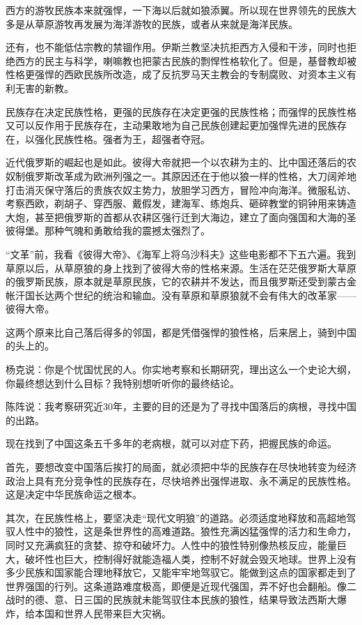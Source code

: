 \par 西方的游牧民族本来就强悍，一下海以后就如狼添翼。所以现在世界领先的民族大多是从草原游牧再发展为海洋游牧的民族，或者从来就是海洋民族。
\par 还有，也不能低估宗教的禁锢作用。伊斯兰教坚决抗拒西方入侵和干涉，同时也拒绝西方的民主与科学，喇嘛教也把蒙古民族的剽悍性格软化了。但是，基督教却被性格更强悍的西欧民族所改造，成了反抗罗马天主教会的专制腐败、对资本主义有利无害的新教。
\par 民族存在决定民族性格，更强的民族存在决定更强的民族性格；而强悍的民族性格又可以反作用于民族存在，主动果敢地为自己民族创建起更加强悍先进的民族存在，以强化民族性格。强者为王，超强者夺冠。
\par 近代俄罗斯的崛起也是如此。彼得大帝就把一个以农耕为主的、比中国还落后的农奴制俄罗斯改革成为欧洲列强之一。其原因还在于他以狼一样的性格，大刀阔斧地打击消灭保守落后的贵族农奴主势力，放胆学习西方，冒险冲向海洋。微服私访、考察西欧，剃胡子、穿西服、戴假发，建海军、练炮兵、砸碎教堂的铜钟用来铸造大炮，甚至把俄罗斯的首都从农耕区强行迁到大海边，建立了面向强国和大海的圣彼得堡。那种气魄和勇敢给我的震撼太强烈了。
\par “文革”前，我看《彼得大帝》、《海军上将乌沙科夫》这些电影都不下五六遍。我到草原以后，从草原狼的身上找到了彼得大帝的性格来源。生活在茫茫俄罗斯大草原的俄罗斯民族，原本就是草原民族，它的农耕并不发达，而且俄罗斯还受到蒙古金帐汗国长达两个世纪的统治和输血。没有草原和草原狼就不会有伟大的改革家——彼得大帝。
\par 这两个原来比自己落后得多的邻国，都是凭借强悍的狼性格，后来居上，骑到中国的头上的。
\par 杨克说：你是个忧国忧民的人。你实地考察和长期研究，理出这么一个史论大纲，你最终想达到什么目标？我特别想听听你的最终结论。
\par 陈阵说：我考察研究近30年，主要的目的还是为了寻找中国落后的病根，寻找中国的出路。
\par 现在找到了中国这条五千多年的老病根，就可以对症下药，把握民族的命运。
\par 首先，要想改变中国落后挨打的局面，就必须把中华的民族存在尽快地转变为经济政治上具有充分竞争性的民族存在，尽快培养出强悍进取、永不满足的民族性格。这是决定中华民族命运之根本。
\par 其次，在民族性格上，要坚决走“现代文明狼”的道路。必须适度地释放和高超地驾驭人性中的狼性，这是条世界性的高难道路。狼性充满凶猛强悍的活力和生命力，同时又充满疯狂的贪婪、掠夺和破坏力。人性中的狼性特别像热核反应，能量巨大，破坏性也巨大，控制得好就能造福人类，控制不好就会毁灭地球。世界上没有多少民族和国家能合理地释放它，又能牢牢地驾驭它。能做到这点的国家都走到了世界强国的行列。这条道路难度极高，即便是近现代强国，弄不好也会翻船。像二战时的德、意、日三国的民族就未能驾驭住本民族的狼性，结果导致法西斯大爆炸，给本国和世界人民带来巨大灾祸。
